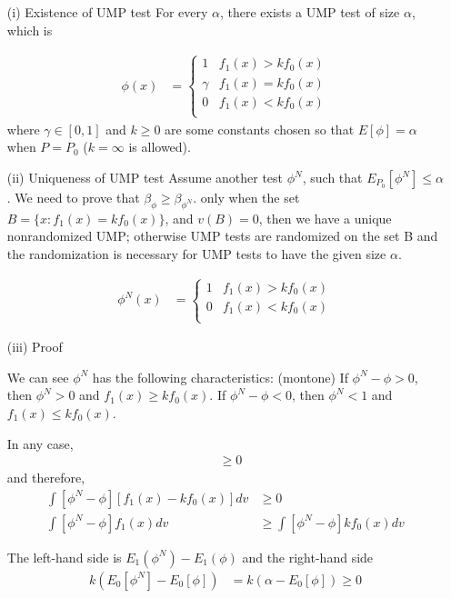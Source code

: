 \begin{itemize}

\item[(i)] Existence of UMP test
For every $\alpha$, there exists a UMP test of size $\alpha$, which is

\begin{align*}
	\phi(x) &= \begin{cases}
	 1 & f_1(x) > k f_0(x) \\
	 \gamma & f_1(x) = k f_0(x) \\
	 0 & f_1(x) < k f_0(x) \\
	\end{cases}
\end{align*}
where $\gamma \in [0,1]$ and $k \geq 0$ are some constants chosen so that $E[\phi] = \alpha$ when $P= P_0$ ($k = \infty$ is allowed).

\item[(ii)] Uniqueness of UMP test
Assume another test $\phi^N$, such that  $E_{P_0}[\phi^N] \leq \alpha$. We need to prove that $\beta_{\phi} \geq \beta_{\phi^N}$.
only when the set $B = \{ x: f_1(x) = k f_0(x)\}$, and $v(B) = 0$, then we have a unique nonrandomized UMP; otherwise UMP tests are randomized on the set B and the randomization is necessary for UMP tests to have the given size $\alpha$.

\begin{align*}
	\phi^N(x) &= \begin{cases}
	 1 & f_1(x) > k f_0(x) \\
	 0 & f_1(x) < k f_0(x) \\
	\end{cases}
\end{align*}

\item[(iii)] Proof

We can see $\phi^N$ has the following characteristics: (montone)
If $\phi^N - \phi > 0$, then $\phi^N > 0$ and $f_1(x) \geq k f_0(x)$.
If $\phi^N - \phi <0$, then $\phi^N < 1$ and $f_1(x) \leq k f_0(x)$.

In any case, 
\begin{align*}
	[\phi^N - \phi] [f_1(x) - k f_0(x)] & \geq 0
\end{align*}
and therefore,
\begin{align*}
	\int [\phi^N - \phi] [f_1(x) - k f_0(x)] dv& \geq 0 \\
	\int [\phi^N - \phi] f_1(x) dv & \geq \int [\phi^N - \phi]  k f_0(x) dv
\end{align*}

The left-hand side is $E_1(\phi^N) - E_1(\phi) $ and the right-hand side 
\begin{align*}
	k (E_0 [\phi^N]  - E_0[ \phi] ) &= k (\alpha - E_0[ \phi]) \geq 0
\end{align*}

\end{itemize}

